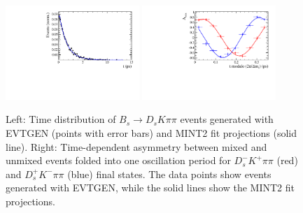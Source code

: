 \clearpage
\begin{figure}[h]
	\centering
		\includegraphics[width=0.45\textwidth, height = !]{figs/timeFit/signal_DsKpipi_CPV_MC/h_t.pdf} 
		\includegraphics[width=0.45\textwidth, height = !]{figs/timeFit/signal_DsKpipi_CPV_MC/h_asym.pdf} 
		
		\caption{Left: Time distribution of $B_s \to D_s K \pi\pi$ events generated with \textsf{EVTGEN} (points with error bars) and \textsf{MINT2} fit projections (solid line). 
                  Right: Time-dependent asymmetry between mixed and unmixed events folded into one oscillation period for 
                  $D_s^- K^+ \pi\pi$ (red) and $D_s^+ K^- \pi\pi$ (blue) final states.
                  The data points show events generated with \textsf{EVTGEN}, while the solid lines show the \textsf{MINT2} fit projections.}
		\label{fig:FitGenMC}	
\end{figure}	

